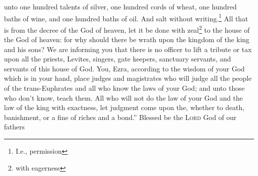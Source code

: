 \begin{enumerate}[align=center]
     unto one hundred talents of silver, one hundred cords of wheat, one hundred baths of wine, and one hundred baths of oil. And salt without writing.\footnote{I.e., permission}%
     All that is from the decree of the God of heaven, let it be done with zeal\footnote{with eagerness} to the house of the God of heaven: for why should there be wrath upon the kingdom of the king and his sons?%
     We are informing you that there is no officer to lift a tribute or tax upon all the priests, Levites, singers, gate keepers, sanctuary servants, and servants of this house of God.%
     You, Ezra, according to the wisdom of your God which is in your hand, place judges and magistrates who will judge all the people of the trans-Euphrates and all who know the laws of your God; and unto those who don't know, teach them.%
     All who will not do the law of your God and the law of the king with exactness, let judgment come upon the, whether to death, banishment, or a fine of riches and a bond.''%
     Blessed be the \textsc{Lord} God of our fathers%
\end{enumerate}
